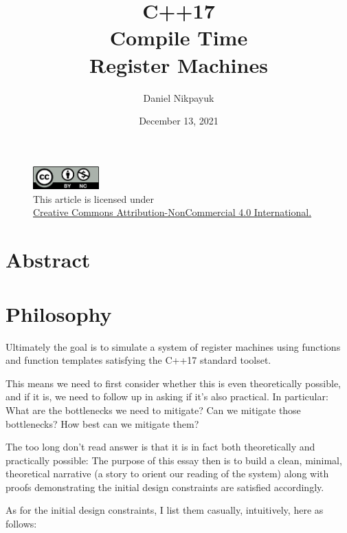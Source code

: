 \documentclass[twoside]{article}
\title{C++17\\Compile Time\\Register Machines}
\author{Daniel Nikpayuk}
\date{December 13, 2021}
\begin{document}
\maketitle
\thispagestyle{empty}

\begin{figure}[h]
\centering
\includegraphics[width=1in]{../../../cc-by-nc.png}\\[0.1in]
\tiny This article is licensed under \\
\href{http://creativecommons.org/licenses/by-nc/4.0/}
{Creative Commons Attribution-NonCommercial 4.0 International.}\\[0.3in]
\end{figure}

\section*{Abstract}

\section*{Philosophy}

Ultimately the goal is to simulate a system of register machines using functions and function templates
satisfying the C++17 standard toolset.

This means we need to first consider whether this is even theoretically possible, and if it is, we need to follow
up in asking if it's also practical. In particular: What are the bottlenecks we need to mitigate? Can we mitigate
those bottlenecks? How best can we mitigate them?

The too long don't read answer is that it is in fact both theoretically and practically possible: The purpose of this
essay then is to build a clean, minimal, theoretical narrative (a story to orient our reading of the system) along
with proofs demonstrating the initial design constraints are satisfied accordingly.

As for the initial design constraints, I list them casually, intuitively, here as follows:
\end{document}
